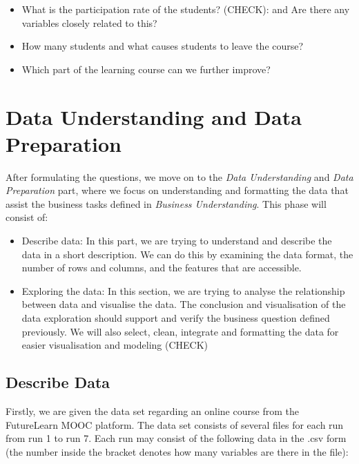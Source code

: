 \documentclass[12pt,]{article}
\providecommand{\tightlist}{%
\setlength{\itemsep}{0pt}\setlength{\parskip}{0pt}}
\begin{document}
\begin{itemize}
\tightlist
\item
  What is the participation rate of the students? (CHECK): and Are there
  any variables closely related to this?
\item
  How many students and what causes students to leave the course?
\item
  Which part of the learning course can we further improve?
\end{itemize}

\hypertarget{data-understanding-and-data-preparation}{%
\section{Data Understanding and Data
Preparation}\label{data-understanding-and-data-preparation}}

After formulating the questions, we move on to the \emph{Data
Understanding} and \emph{Data Preparation} part, where we focus on
understanding and formatting the data that assist the business tasks
defined in \emph{Business Understanding}. This phase will consist of:

\begin{itemize}
\item
  Describe data: In this part, we are trying to understand and describe
  the data in a short description. We can do this by examining the data
  format, the number of rows and columns, and the features that are
  accessible.
\item
  Exploring the data: In this section, we are trying to analyse the
  relationship between data and visualise the data. The conclusion and
  visualisation of the data exploration should support and verify the
  business question defined previously. We will also select, clean,
  integrate and formatting the data for easier visualisation and
  modeling (CHECK)
\end{itemize}

\hypertarget{describe-data}{%
\subsection{Describe Data}\label{describe-data}}

Firstly, we are given the data set regarding an online course from the
FutureLearn MOOC platform. The data set consists of several files for
each run from run 1 to run 7. Each run may consist of the following data
in the .csv form (the number inside the bracket denotes how many
variables are there in the file):
\end{document}
